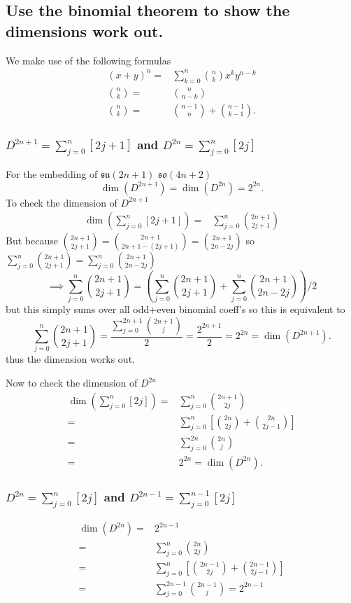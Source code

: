 \documentclass[main.tex]{subfiles}
\begin{document}
\subsection{Use the binomial theorem to show the dimensions work out.}
We make use of the following formulas
\begin{align}
(x+y)^n=&\sum_{k=0}^n{\binom{n}{k}x^ky^{n-k}}\\
\binom{n}{k}=&\binom{n}{n-k}\\
\binom{n}{k}=&\binom{n-1}{n}+\binom{n-1}{k-1}.
\end{align}
\subsubsection{$D^{2n+1}=\sum^n_{j=0}[2j+1]$ and $D^{2n}=\sum^n_{j=0}[2j]$}
For the embedding of $\mathfrak{su}(2n+1)$ $\mathfrak{so}(4n+2)$
\begin{equation}
\dim{(D^{2n+1})}=\dim{(D^{2n})}=2^{2n}.
\end{equation}
To check the dimension of $D^{2n+1}$
\begin{align}
\dim{\left(\sum^n_{j=0}[2j+1]\right)}=&\sum^n_{j=0}\binom{2n+1}{2j+1}
\end{align}
But because $\binom{2n+1}{2j+1}=\binom{2n+1}{2n+1-(2j+1)}=\binom{2n+1}{2n-2j}$ so $\sum^n_{j=0}\binom{2n+1}{2j+1}=\sum^n_{j=0}\binom{2n+1}{2n-2j}$
\begin{equation}
\implies \sum^n_{j=0}\binom{2n+1}{2j+1}=\left(\sum^n_{j=0}\binom{2n+1}{2j+1}+\sum^n_{j=0}\binom{2n+1}{2n-2j}\right)/2
\end{equation}
but this simply sums over all odd+even binomial coeff's so this is equivalent to
\begin{equation}
\sum^n_{j=0}\binom{2n+1}{2j+1}=\frac{\sum^{2n+1}_{j=0}\binom{2n+1}{j}}{2}=\frac{2^{2n+1}}{2}=2^{2n}=\dim{(D^{2n+1})}.
\end{equation}
thus the dimension works out.

Now to check the dimension of $D^{2n}$
\begin{align}
\dim{\left(\sum^n_{j=0}[2j]\right)}=&\sum^n_{j=0}\binom{2n+1}{2j}\\
=&\sum^n_{j=0}\left[\binom{2n}{2j}+\binom{2n}{2j-1}\right]\\
=&\sum^{2n}_{j=0}\binom{2n}{j}\\
=&2^{2n}=\dim{(D^{2n})}.
\end{align}

\subsubsection{$D^{2n}=\sum^n_{j=0}[2j]$ and $D^{2n-1}=\sum^{n-1}_{j=0}[2j]$}
\begin{align}
\dim(D^{2n})=&2^{2n-1}\\
=&\sum^n_{j=0}\binom{2n}{2j}\\
=&\sum^n_{j=0}\left[\binom{2n-1}{2j}+\binom{2n-1}{2j-1}\right]\\
=&\sum^{2n-1}_{j=0}\binom{2n-1}{j}=2^{2n-1}
\end{align}
\end{document}

